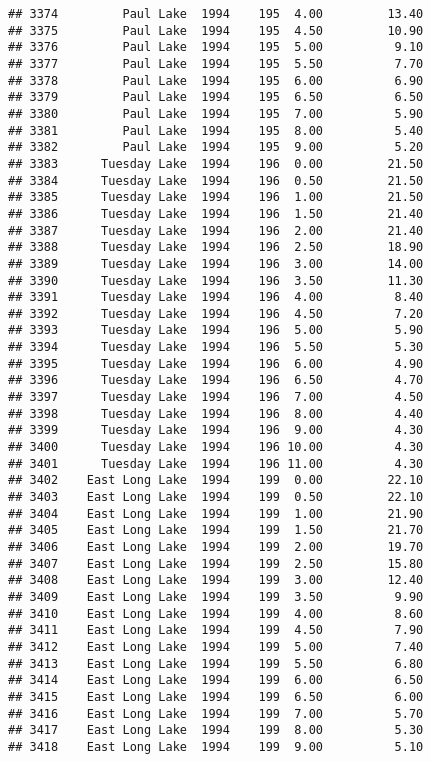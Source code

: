 \documentclass[
]{article}
\begin{document}
\begin{verbatim}
## 3374         Paul Lake  1994    195  4.00         13.40
## 3375         Paul Lake  1994    195  4.50         10.90
## 3376         Paul Lake  1994    195  5.00          9.10
## 3377         Paul Lake  1994    195  5.50          7.70
## 3378         Paul Lake  1994    195  6.00          6.90
## 3379         Paul Lake  1994    195  6.50          6.50
## 3380         Paul Lake  1994    195  7.00          5.90
## 3381         Paul Lake  1994    195  8.00          5.40
## 3382         Paul Lake  1994    195  9.00          5.20
## 3383      Tuesday Lake  1994    196  0.00         21.50
## 3384      Tuesday Lake  1994    196  0.50         21.50
## 3385      Tuesday Lake  1994    196  1.00         21.50
## 3386      Tuesday Lake  1994    196  1.50         21.40
## 3387      Tuesday Lake  1994    196  2.00         21.40
## 3388      Tuesday Lake  1994    196  2.50         18.90
## 3389      Tuesday Lake  1994    196  3.00         14.00
## 3390      Tuesday Lake  1994    196  3.50         11.30
## 3391      Tuesday Lake  1994    196  4.00          8.40
## 3392      Tuesday Lake  1994    196  4.50          7.20
## 3393      Tuesday Lake  1994    196  5.00          5.90
## 3394      Tuesday Lake  1994    196  5.50          5.30
## 3395      Tuesday Lake  1994    196  6.00          4.90
## 3396      Tuesday Lake  1994    196  6.50          4.70
## 3397      Tuesday Lake  1994    196  7.00          4.50
## 3398      Tuesday Lake  1994    196  8.00          4.40
## 3399      Tuesday Lake  1994    196  9.00          4.30
## 3400      Tuesday Lake  1994    196 10.00          4.30
## 3401      Tuesday Lake  1994    196 11.00          4.30
## 3402    East Long Lake  1994    199  0.00         22.10
## 3403    East Long Lake  1994    199  0.50         22.10
## 3404    East Long Lake  1994    199  1.00         21.90
## 3405    East Long Lake  1994    199  1.50         21.70
## 3406    East Long Lake  1994    199  2.00         19.70
## 3407    East Long Lake  1994    199  2.50         15.80
## 3408    East Long Lake  1994    199  3.00         12.40
## 3409    East Long Lake  1994    199  3.50          9.90
## 3410    East Long Lake  1994    199  4.00          8.60
## 3411    East Long Lake  1994    199  4.50          7.90
## 3412    East Long Lake  1994    199  5.00          7.40
## 3413    East Long Lake  1994    199  5.50          6.80
## 3414    East Long Lake  1994    199  6.00          6.50
## 3415    East Long Lake  1994    199  6.50          6.00
## 3416    East Long Lake  1994    199  7.00          5.70
## 3417    East Long Lake  1994    199  8.00          5.30
## 3418    East Long Lake  1994    199  9.00          5.10

\end{verbatim}
\end{document}
